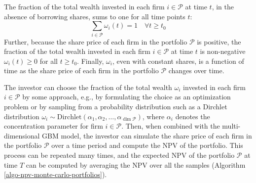 \documentclass[11pt]{article}
\theoremstyle{definition}
\begin{document}
\begin{concept}\label{concept:properties-of-omega}
The fraction of the total wealth invested in each firm $i\in\mathcal{P}$ at time $t$, in the absence of borrowing shares, sums to one for all time points $t$:
\begin{equation*}
\sum_{i\in\mathcal{P}}\omega_{i}(t) = 1\quad\forall{t\geq{t_{0}}}
\end{equation*}
Further, because the share price of each firm in the portfolio $\mathcal{P}$ is positive, the fraction of the total wealth invested in each firm $i\in\mathcal{P}$ at time $t$ is non-negative $\omega_{i}(t)\geq{0}$ for all $t\geq{t_{0}}$. 
Finally, $\omega_{i}$, even with constant shares, is a function of time as the share price of each firm in the portfolio $\mathcal{P}$ changes over time.
\end{concept}
The investor can choose the fraction of the total wealth $\omega_{i}$ invested in each firm $i\in\mathcal{P}$ by some approach, e.g., by formulating the choice as an optimization problem or by sampling from a probability distribution such as a Dirchlet distribution $\omega_{i}\sim\text{Dirchlet}(\alpha_{1},\alpha_{2},\dots,\alpha_{\dim\mathcal{P}})$, where $\alpha_{i}$ denotes the concentration parameter for firm $i\in\mathcal{P}$. Then, when combined with the multi-dimensional GBM model, the investor can simulate the share price of each firm in the portfolio $\mathcal{P}$ over a time period and compute the NPV of the portfolio. This process can be repeated many times, and the expected NPV of the portfolio $\mathcal{P}$ at time $T$ can be computed by averaging the NPV over all the samples (Algorithm \ref{algo-npv-monte-carlo-portfolios}).
\end{document}
